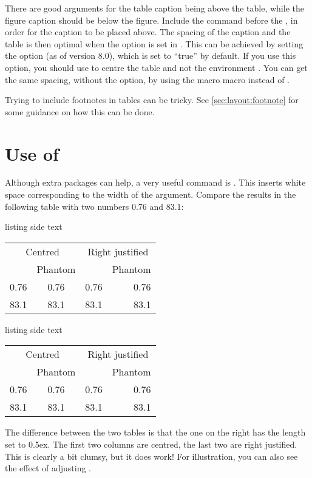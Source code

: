 There are good arguments for the table caption being above the table,
while the figure caption should be below the figure.
Include the  command before the ,
in order for the caption to be placed above.
The spacing of the caption and the table is then optimal
when the option 
is set in \KOMAScript.
This can be achieved by setting the option  (as of version 8.0), which is set to \enquote{true} by default.
If you use this option, you should use  to centre the table
and not the environment .
You can get the same spacing, without the  option,
by using the macro  macro instead of .

Trying to include footnotes in tables can be tricky.
See \cref{sec:layout:footnote} for some guidance on how this can be done.


\section{Use of \texorpdfstring{}{phantom}}%
\label{sec:table:phantom}

Although extra packages can help, a very useful command is
. This inserts white space corresponding to the width
of the argument. Compare the results in the following table with two
numbers 0.76 and 83.1:

\begin{tcblisting}{listing side text}
\begin{tabular}{cc|rr} %
  \multicolumn{2}{c|}{Centred} &
  \multicolumn{2}{c}{Right justified} \\
  & Phantom & & Phantom\\\hline %
  0.76 & \phantom{0}0.76 & 0.76 & 0.76\\
  83.1 & 83.1\phantom{0} & 83.1 & 83.1\phantom{0}
\end{tabular}
\end{tcblisting}
\begin{tcblisting}{listing side text}
{\setlength{\extrarowheight}{0.5ex}
\begin{tabular}{cc|rr} %
  \multicolumn{2}{c|}{Centred} &
  \multicolumn{2}{c}{Right justified} \\
  & Phantom & & Phantom\\\hline %
  0.76 & \phantom{0}0.76 & 0.76 & 0.76\\
  83.1 & 83.1\phantom{0} & 83.1 & 83.1\phantom{0}
\end{tabular}
}
\end{tcblisting}
\par\noindent
The difference between the two tables is that the one on the right
has the length  set to 0.5ex.
The first two columns are centred, the last two are right justified.
This is clearly a bit clumsy, but it does work!
For illustration, you can also see the effect of adjusting .


